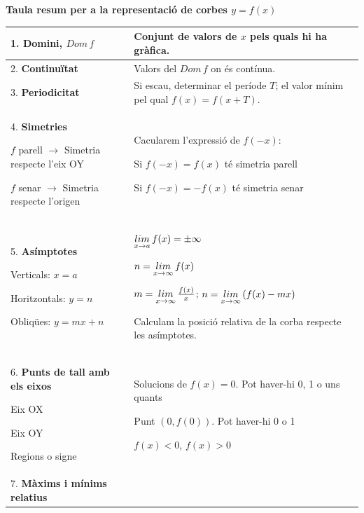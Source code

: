 
	\begin{center}
		\textbf{\footnotesize Taula resum per a la representació de corbes $y=f(x)$}
		\setlength\LTleft{0pt}
		\setlength\LTright{0pt}
		\fontsize{10.5}{11}
		\def\arraystretch{1}
		\begin{longtable}[!htb]{|p{}|p{}|}
			\hline
			1. \textbf{Domini}, $Dom\, f$ & Conjunt de valors de $x$ pels quals hi ha gràfica. \\  [1.5ex] \hline 
			2.  \textbf{Continuïtat} & Valors del $Dom\, f$ on és contínua. \\  [1.5ex] \hline 
			3.  \textbf{Periodicitat} & Si escau, determinar el període $T$; el valor mínim pel qual $f(x)=f(x+T)$. \\  [1.5ex] \hline 
			4.  \textbf{Simetries}
			
			$f$ parell $\rightarrow$ Simetria respecte l'eix OY
			
			$f$ senar $\rightarrow$ Simetria respecte l'origen 
			
			& Cacularem l'expressió de $f(-x)$:
			
			Si $f(-x)=f(x)$ té simetria parell
			
			Si $f(-x)=-f(x)$ té simetria senar
			\\  [1.5ex] \hline 
			5. \textbf{Asímptotes}
			
			Verticals: $x=a$
			
			Horitzontals: $y=n$
			
			Obliqües: $y=mx+n$
			
			& 
			\newline
			$\mathop{lim}\limits_{x\to a} f(x)=\pm \infty$
			
			$n=\mathop{lim}\limits_{x\to \infty} f(x)$
			
			$m=\mathop{lim}\limits_{x\to \infty} \frac{f(x)}{x}$; \quad $n=\mathop{lim}\limits_{x\to \infty} \left(f(x)-mx\right)$
			
			
			Calculam la posició relativa de la corba respecte les asímptotes.
			\\  [1.5ex] \hline 
			6. \textbf{Punts de tall amb els eixos}
			
			Eix OX
			
			Eix OY
			
			Regions o signe
			& \newline
			Solucions de $f(x)=0$. Pot haver-hi 0, 1 o uns quants
			
			Punt $(0, f(0))$. Pot haver-hi 0 o 1
			
			$f(x)<0$, $f(x)>0$  
			\\  [1.5ex] \hline 
			7. \textbf{Màxims i mínims relatius}
			\newline
			\newline
			\newline
			

\end{longtable}
\end{center}
